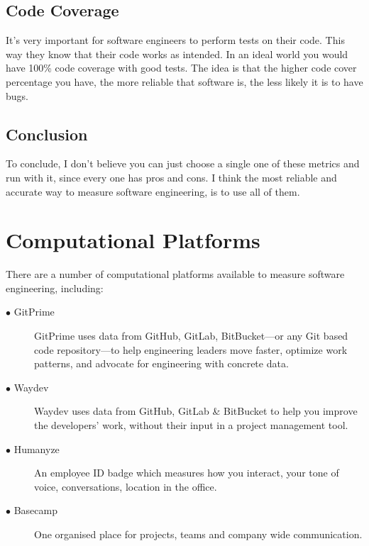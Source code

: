\documentclass[12pt]{report}
\begin{document}
\subsection{Code Coverage}
It's very important for software engineers to perform tests on their code. This way they know that their code works as intended. In an ideal world you would have 100\% code coverage with good tests. The idea is that the higher code cover percentage you have, the more reliable that software is, the less likely it is to have bugs. 


\subsection{Conclusion}
To conclude, I don't believe you can just choose a single one of these metrics and run with it, since every one has pros and cons. I think the most reliable and accurate way to measure software engineering, is to use all of them.




\section{Computational Platforms}
There are a number of computational platforms available to measure software engineering, including:
\begin{description}

\item[$\bullet$ GitPrime] GitPrime uses data from GitHub, GitLab, BitBucket—or any Git based code repository—to help engineering leaders move faster, optimize work patterns, and advocate for engineering with concrete data.

\item[$\bullet$ Waydev] Waydev uses data from GitHub, GitLab \& BitBucket to help you improve the developers’ work, without their input in a project management tool.

\item[$\bullet$ Humanyze] An employee ID badge which measures how you interact, your tone of voice, conversations, location in the office.

\item[$\bullet$ Basecamp] One organised place for projects, teams and company wide communication. 

\end{description}
\end{document}
